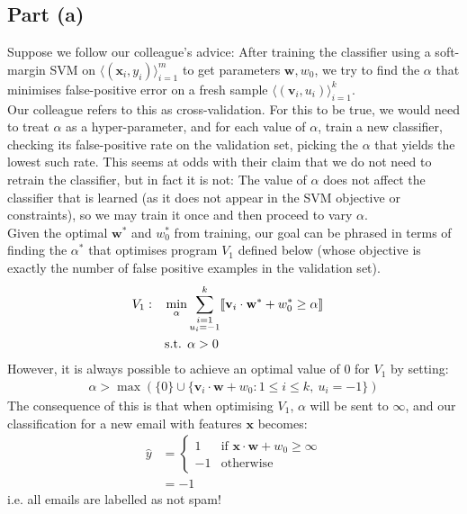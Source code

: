 \subsection{Part (a)}

Suppose we follow our colleague's advice: After training the classifier using a soft-margin SVM on $\langle(\mathbf{x}_i,y_i)\rangle_{i=1}^m$ to get parameters $\mathbf{w}, w_0$, we try to find the $\alpha$ that minimises false-positive error on a fresh sample $\langle(\mathbf{v}_i,u_i)\rangle_{i=1}^k$.\\[1em]

Our colleague refers to this as cross-validation. For this to be true, we would need to treat $\alpha$ as a hyper-parameter, and for each value of $\alpha$, train a new classifier, checking its false-positive rate on the validation set, picking the $\alpha$ that yields the lowest such rate. This seems at odds with their claim that we do not need to retrain the classifier, but in fact it is not: The value of $\alpha$ does not affect the classifier that is learned (as it does not appear in the SVM objective or constraints), so we may train it once and then proceed to vary $\alpha$.\\[1em]

Given the optimal $\mathbf{w}^\ast$ and $w_0^\ast$ from training, our goal can be phrased in terms of finding the $\alpha^\ast$ that optimises program $V_1$ defined below (whose objective is exactly the number of false positive examples in the validation set).
\begin{align*}
  V_1: && \min_{\alpha} & \sum_{\substack{i=1\\u_i=-1}}^k\llbracket \mathbf{v}_i\cdot\mathbf{w}^\ast+w_0^\ast\geq\alpha \rrbracket &&
  \\   && \text{s.t. } & \alpha > 0 &&
\end{align*}
However, it is always possible to achieve an optimal value of $0$ for $V_1$ by setting:
\begin{align*}
  \alpha > \max(\{0\}\cup\{\mathbf{v}_i\cdot\mathbf{w}+w_0:1\leq i\leq k,~u_i=-1\})
\end{align*}
The consequence of this is that when optimising $V_1$, $\alpha$ will be sent to $\infty$, and our classification for a new email with features $\mathbf{x}$ becomes:
\begin{align*}
  \widehat{y} & =
  \begin{cases}
    1 & \text{if }\mathbf{x}\cdot\mathbf{w} + w_0\geq\infty\\
    -1 & \text{otherwise}
  \end{cases}
  \\ & = -1
\end{align*}
i.e. all emails are labelled as not spam!\\[1em]

